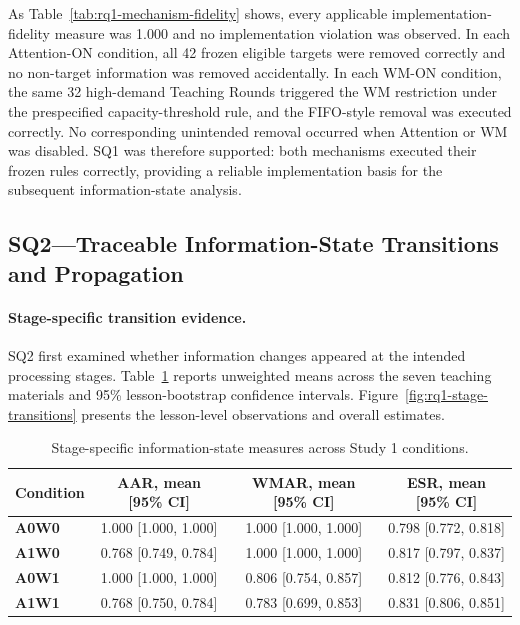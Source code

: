 As Table~\ref{tab:rq1-mechanism-fidelity} shows, every applicable implementation-fidelity measure was 1.000 and no implementation violation was observed. In each Attention-ON condition, all 42 frozen eligible targets were removed correctly and no non-target information was removed accidentally. In each WM-ON condition, the same 32 high-demand Teaching Rounds triggered the WM restriction under the prespecified capacity-threshold rule, and the FIFO-style removal was executed correctly. No corresponding unintended removal occurred when Attention or WM was disabled. SQ1 was therefore supported: both mechanisms executed their frozen rules correctly, providing a reliable implementation basis for the subsequent information-state analysis.

\subsection{SQ2---Traceable Information-State Transitions and Propagation}
\label{subsec:rq1-sq2}

\paragraph{Stage-specific transition evidence.}

SQ2 first examined whether information changes appeared at the intended processing stages. Table~\ref{tab:rq1-stage-measures} reports unweighted means across the seven teaching materials and 95\% lesson-bootstrap confidence intervals. Figure~\ref{fig:rq1-stage-transitions} presents the lesson-level observations and overall estimates.

\begin{table}[H]
\centering
\caption{Stage-specific information-state measures across Study 1 conditions.}
\label{tab:rq1-stage-measures}
\scriptsize
\setlength{\tabcolsep}{4pt}
\renewcommand{\arraystretch}{1.2}
\begin{tabular}{lccc}
\toprule
\textbf{Condition} & \textbf{AAR, mean [95\% CI]} & \textbf{WMAR, mean [95\% CI]} & \textbf{ESR, mean [95\% CI]} \\
\midrule
\textbf{A0W0} & 1.000 [1.000, 1.000] & 1.000 [1.000, 1.000] & 0.798 [0.772, 0.818] \\
\textbf{A1W0} & 0.768 [0.749, 0.784] & 1.000 [1.000, 1.000] & 0.817 [0.797, 0.837] \\
\textbf{A0W1} & 1.000 [1.000, 1.000] & 0.806 [0.754, 0.857] & 0.812 [0.776, 0.843] \\
\textbf{A1W1} & 0.768 [0.750, 0.784] & 0.783 [0.699, 0.853] & 0.831 [0.806, 0.851] \\
\bottomrule
\end{tabular}
\end{table}

